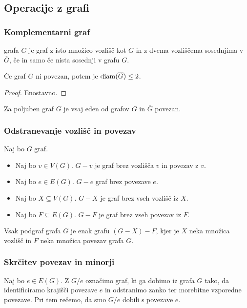 \subsection{Operacije z grafi}
\subsubsection*{Komplementarni graf}
\begin{definicija}
     grafa $G$ je graf z isto množico vozlišč kot $G$ in z dvema vozliščema sosednjima v $\overline{G}$, če in samo če nista sosednji v grafu $G$.
\end{definicija}

\begin{trditev}
    Če graf $G$ ni povezan, potem je $\operatorname{diam}(\overline{G}) \leq 2$.
\end{trditev}

\begin{proof}
    Enostavno.
\end{proof}

\begin{posledica}
    Za poljuben graf $G$ je vsaj eden od grafov $G$ in $\overline{G}$ povezan.
\end{posledica}

\subsubsection*{Odstranevanje vozlišč in povezav}
Naj bo $G$ graf.
\begin{itemize}
    \item Naj bo $v \in V(G)$. $G - v$ je graf brez vozlišča $v$ in povezav z $v$.
    \item Naj bo $e \in E(G)$. $G - e$ graf brez povezave $e$.
    \item Naj bo $X \subseteq V(G)$. $G - X$ je graf brez vseh vozlišč iz $X$.
    \item Naj bo $F \subseteq E(G)$. $G-F$ je graf brez vseh povezav iz $F$.
\end{itemize}

\begin{opomba}
    Vsak podgraf grafa $G$ je enak grafu $(G-X)-F$, kjer je $X$ neka množica vozlišč in $F$ neka množica povezav grafa $G$.
\end{opomba}

\subsubsection*{Skrčitev povezav in minorji}
Naj bo $e \in E(G)$. Z $G/e$ označimo graf, ki ga dobimo iz grafa $G$ tako, da identificiramo krajišči povezave $e$ in odstranimo zanko ter morebitne vzporedne povezave. Pri tem rečemo, da smo $G / e$ dobili s  povezave $e$.

